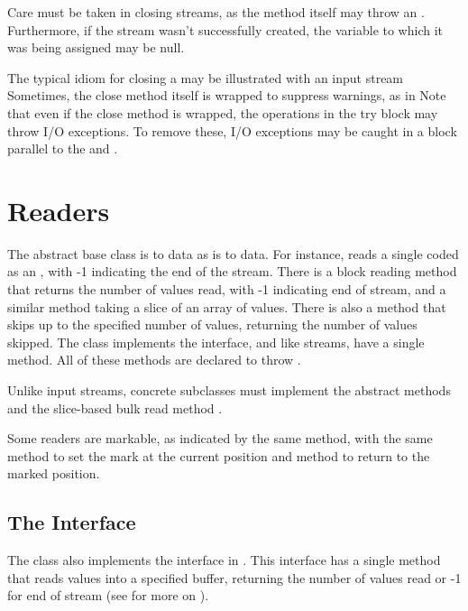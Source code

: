 Care must be taken in closing streams, as the  method
itself may throw an .  Furthermore, if the stream
wasn't successfully created, the variable to which it was being
assigned may be null.

The typical idiom for closing a  may be illustrated
with an input stream
%
%
Sometimes, the close method itself is wrapped to suppress
warnings, as in
%
%
Note that even if the close method is wrapped, the operations in the
try block may throw I/O exceptions.  To remove these, I/O exceptions
may be caught in a block parallel to the  and
.


\section{Readers}

The  abstract base class is to  data as
 is to  data.  For instance,
 reads a single  coded as an , with
-1 indicating the end of the stream.  There is a block reading
method  that returns the number of values read,
with -1 indicating end of stream, and a similar method taking a slice
of an array of  values.  There is also a 
method that skips up to the specified number of  values,
returning the number of values skipped.  The  class
implements the  interface, and like streams, have a
single  method.  All of these methods are declared to
throw .

Unlike input streams, concrete subclasses must implement the abstract
methods  and the slice-based bulk read method
.

Some readers are markable, as indicated by the same
 method, with the same  method to
set the mark at the current position and  method to
return to the marked position.

\subsection{The  Interface}

The  class also implements the  interface
in .  This interface has a single method
 that reads  values into a specified
buffer, returning the number of values read or -1 for end of stream
(see  for more on ).


